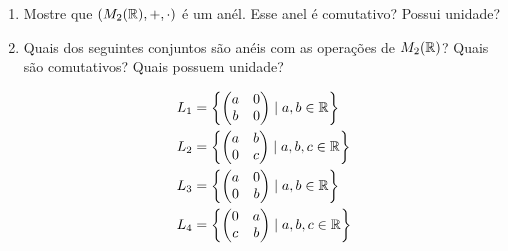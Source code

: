 \documentclass[12pt]{exam}
\begin{document}
    \begin{enumerate}[label=({\alph*})]
        \item Mostre que $(M_2(\mathbb{R}), + , \cdot)$ \'e um an\'el. Esse anel \'e comutativo? Possui unidade?
        \item Quais dos seguintes conjuntos s\~ao an\'eis com as opera\c{c}\~oes de $M_2(\mathbb{R})$? Quais s\~ao comutativos? Quais possuem unidade?

        \begin{align*}
            L_1 &= \left\{\begin{pmatrix}
                a & 0\\
                b & 0
            \end{pmatrix} \mid a, b \in \mathbb{R}\right\}\\
            L_2 &= \left\{\begin{pmatrix}
                a & b\\
                0 & c
            \end{pmatrix} \mid a, b, c \in \mathbb{R}\right\}\\
            L_3 &= \left\{\begin{pmatrix}
                a & 0\\
                0 & b
            \end{pmatrix} \mid a, b \in \mathbb{R}\right\}\\
            L_4 &= \left\{\begin{pmatrix}
                0 & a\\
                c & b
            \end{pmatrix} \mid a, b, c \in \mathbb{R}\right\}
        \end{align*}
    \end{enumerate}

    \vspace{.4cm}
\end{document}
